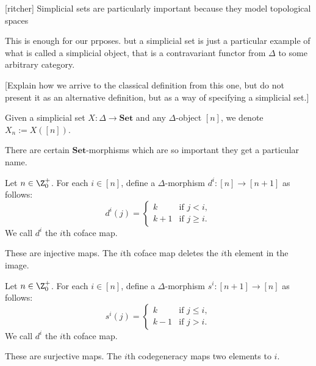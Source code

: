 [ritcher] Simplicial sets are particularly important because they model topological spaces

This is enough for our prposes.
but
a simplicial set is just a particular example of what is called a simplicial object, that is a contravariant functor from \(\Delta\) to some arbitrary category.

[Explain how we arrive to the classical definition from this one, but do not present it as an alternative definition, but as a way of specifying a simplicial set.]



\begin{remark}
    Given a simplicial set \(X\colon \Delta\to \mathbf{Set}\) and any \(\Delta\)-object \([n]\), 
    we denote \(X_n := X([n])\).
\end{remark}

There are certain \(\mathbf{Set}\)-morphisms which are so important they get a particular name.

\begin{definition}
    Let \(n\in \Z^+_0\). 
    For each \(i\in [n]\), 
    define a \(\Delta\)-morphism \(d^i\colon [n] \to [n+1]\) as follows:
    \[d^i(j) = \begin{cases}
        k& \text{if } j < i,\\
        k+1 & \text{if } j\geq  i.
    \end{cases}\]
    We call \(d^i\) the \(i\)th coface map.
\end{definition}

These are injective maps.
The \(i\)th coface map deletes the \(i\)th element in the image.

\begin{definition}
    Let \(n\in \Z^+_0\). 
    For each \(i\in [n]\), 
    define a \(\Delta\)-morphism \(s^i\colon [n+1] \to [n]\) as follows:
    \[s^i(j) = \begin{cases}
        k& \text{if } j \leq i,\\
        k-1 & \text{if } j >  i.
    \end{cases}\]
    We call \(d^i\) the \(i\)th coface map.
\end{definition}

These are surjective maps.
The \(i\)th codegeneracy maps two elements to \(i\).

